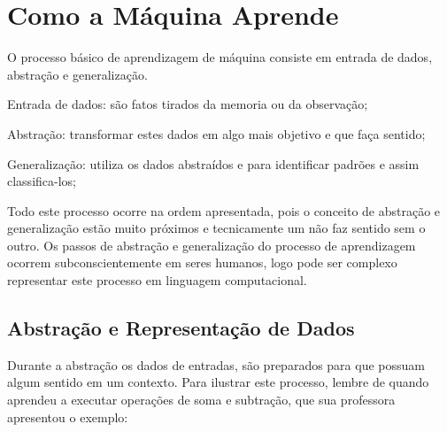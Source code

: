 \section{Como a Máquina Aprende}
\label{sec:howdoesmachinelearn}

O processo básico de aprendizagem de máquina consiste em entrada de dados, abstração e generalização.
\begin{alineas}
	\item Entrada de dados: são fatos tirados da memoria ou da observação;
	\item Abstração: transformar estes dados em algo mais objetivo e que faça sentido;
	\item Generalização: utiliza os dados abstraídos e para  identificar padrões e assim classifica-los;			
\end{alineas}

\begin{figure}[h!]
	\centering
\end{figure}

Todo este processo ocorre na ordem apresentada, pois o conceito de abstração e generalização estão muito próximos e tecnicamente um não faz sentido sem o outro. Os passos de abstração e generalização do processo de aprendizagem ocorrem subconscientemente em seres humanos, logo pode ser complexo representar este processo em linguagem computacional.


\subsection{Abstração e Representação de Dados}
\label{cap:abs-representacao-dados}

Durante a abstração os dados de entradas, são preparados para que possuam algum sentido em um contexto.
Para ilustrar este processo, lembre de quando aprendeu a executar operações de soma e subtração, que sua professora apresentou o exemplo:

\begin{figure}[h!]
	\centering
\end{figure}

